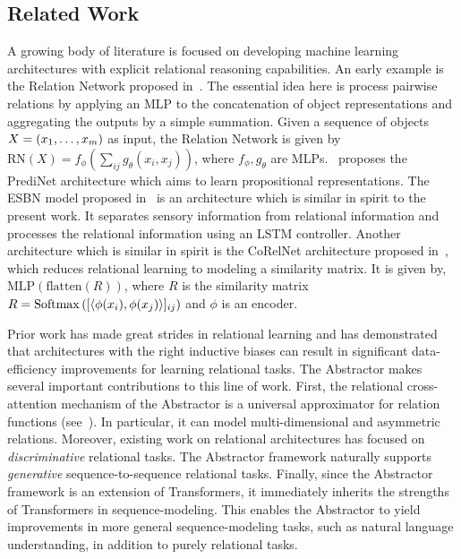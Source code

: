 \subsection{Related Work}

A growing body of literature is focused on developing machine learning architectures with explicit relational reasoning capabilities. An early example is the Relation Network proposed in~\citep{santoro1}. The essential idea here is process pairwise relations by applying an MLP to the concatenation of object representations and aggregating the outputs by a simple summation. Given a sequence of objects $X = (x_1, \ldots, x_m)$ as input, the Relation Network is given by $\mathrm{RN}(X) = f_\phi(\sum_{ij} g_\theta(x_i, x_j))$, where $f_\phi, g_\theta$ are MLPs.~\citep{shanahanExplicitlyRelationalNeural} proposes the PrediNet architecture which aims to learn propositional representations. The ESBN model proposed in~\citep{esbn} is an architecture which is similar in spirit to the present work. It separates sensory information from relational information and processes the relational information using an LSTM controller. Another architecture which is similar in spirit is the CoRelNet architecture proposed in~\citep{kerg2022neural}, which reduces relational learning to modeling a similarity matrix. It is given by, $\mathrm{MLP}(\mathrm{flatten}(R))$, where $R$ is the similarity matrix $R = \mathrm{Softmax}\left([\left \langle \phi(x_i), \phi(x_j) \right\rangle]_{ij}\right)$ and $\phi$ is an encoder.

Prior work has made great strides in relational learning and has demonstrated that architectures with the right inductive biases can result in significant data-efficiency improvements for learning relational tasks. The Abstractor makes several important contributions to this line of work. First, the relational cross-attention mechanism of the Abstractor is a universal approximator for relation functions (see~). In particular, it can model multi-dimensional and asymmetric relations. Moreover, existing work on relational architectures has focused on \textit{discriminative} relational tasks. The Abstractor framework naturally supports \textit{generative} sequence-to-sequence relational tasks. Finally, since the Abstractor framework is an extension of Transformers, it immediately inherits the strengths of Transformers in sequence-modeling. This enables the Abstractor to yield improvements in more general sequence-modeling tasks, such as natural language understanding, in addition to purely relational tasks.